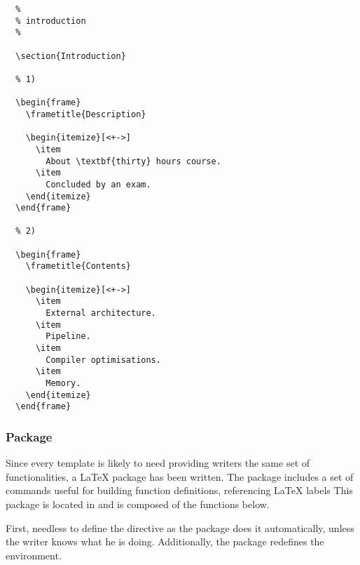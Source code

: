 \begin{verbatim}
  %
  % introduction
  %

  \section{Introduction}

  % 1)

  \begin{frame}
    \frametitle{Description}

    \begin{itemize}[<+->]
      \item
        About \textbf{thirty} hours course.
      \item
        Concluded by an exam.
    \end{itemize}
  \end{frame}

  % 2)

  \begin{frame}
    \frametitle{Contents}

    \begin{itemize}[<+->]
      \item
        External architecture.
      \item
        Pipeline.
      \item
        Compiler optimisations.
      \item
        Memory.
    \end{itemize}
  \end{frame}
\end{verbatim}


\subsubsection{ Package}

Since every template is likely to need providing writers the same set
of functionalities, a {\LaTeX} package has been written. The  package
includes a set of commands useful for building function definitions,
referencing {\LaTeX} labels \etc{} This package is located in
 and is composed of the functions below.

First, needless to define the  directive as the 
package does it automatically, unless the writer knows what he is doing.
Additionally, the package redefines the  environment.

